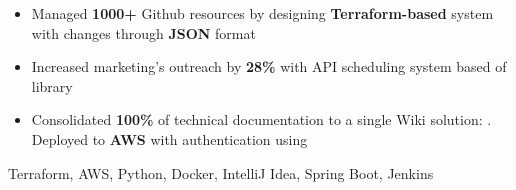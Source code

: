 \begin{experiences}
{\begin{itemize}
                        \item Managed \textbf{1000+} Github resources by designing \textbf{Terraform-based} system with changes through \textbf{JSON} format

                        \item Increased marketing's outreach by \textbf{28\%} with API scheduling system based of  library
                        
                        \item Consolidated \textbf{100\%} of technical documentation to a single Wiki solution: . Deployed to \textbf{AWS} with authentication using 
                    \end{itemize}
                    }
                    {Terraform, AWS, Python, Docker, IntelliJ Idea, Spring Boot, Jenkins}
\end{experiences}
